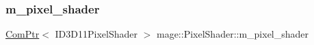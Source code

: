 \hypertarget{classmage_1_1_pixel_shader_a1dd0f87be1c1f7fe5a1bb2737263222f}{}\label{classmage_1_1_pixel_shader_a1dd0f87be1c1f7fe5a1bb2737263222f} 
\subsubsection{\texorpdfstring{m\+\_\+pixel\+\_\+shader}{m\_pixel\_shader}}
{\footnotesize\ttfamily \hyperlink{namespacemage_ae74f374780900893caa5555d1031fd79}{Com\+Ptr}$<$ I\+D3\+D11\+Pixel\+Shader $>$ mage\+::\+Pixel\+Shader\+::m\+\_\+pixel\+\_\+shader\hspace{0.3cm}{\ttfamily [protected]}}

